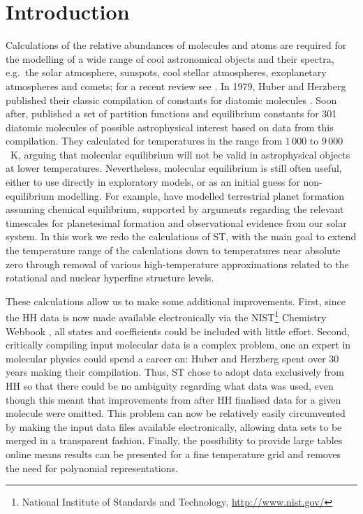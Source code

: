 \documentclass[traditabstract]{aa} %
\begin{document}
\section{Introduction}

Calculations of the relative abundances of molecules and atoms are required for the modelling of a wide range of cool astronomical objects and their spectra, e.g.\ the solar atmosphere, sunspots, cool stellar atmospheres, exoplanetary atmospheres and comets; for a recent review see \cite{2009IRPC...28..681B}.  In 1979, Huber and Herzberg published their classic compilation of constants for diatomic molecules \citep[][hereafter HH]{HH}.  Soon after, \citet[][hereafter ST]{1984ApJS...56..193S} published a set of partition functions and equilibrium constants for 301 diatomic molecules of possible astrophysical interest based on data from this compilation.  They calculated for temperatures in the range from $1\,000$ to $9\,000$~K, arguing that molecular equilibrium will not be valid in astrophysical objects at lower temperatures.  Nevertheless, molecular equilibrium is still often useful, either to use directly in exploratory models, or as an initial guess for non-equilibrium modelling.  For example, \citet{2010ApJ...715.1050B} have modelled terrestrial planet formation assuming chemical equilibrium, supported by arguments regarding the relevant timescales for planetesimal formation and observational evidence from our solar system.  In this work we redo the calculations of ST, with the main goal to extend the temperature range of the calculations down to temperatures near absolute zero through removal of various high-temperature approximations related to the rotational and nuclear hyperfine structure levels.   

These calculations allow us to make some additional improvements.  First, since the HH data is now made available electronically via the NIST\footnote{National Institute of Standards and Technology, \url{http://www.nist.gov/}} Chemistry Webbook \citep{HHb}, all states and coefficients could be included with little effort.  Second, critically compiling input molecular data is a complex problem, one an expert in molecular physics could spend a career on: Huber and Herzberg spent over 30 years making their compilation.  Thus, ST chose to adopt data exclusively from HH so that there could be no ambiguity regarding what data was used, even though this meant that improvements from after HH finalised data for a given molecule were omitted.  This problem can now be relatively easily circumvented by making the input data files available electronically, allowing data sets to be merged in a transparent fashion.   Finally, the possibility to provide large tables online means results can be presented for a fine temperature grid and removes the need for polynomial representations.
\end{document}
